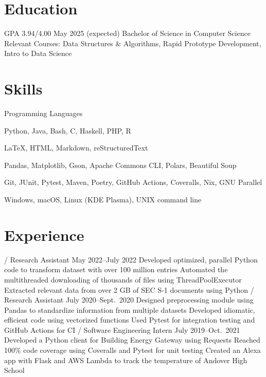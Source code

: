 \section{Education}
\begin{doutline}
     GPA 3.94/4.00
    \hfill May 2025 (expected)
        \2 Bachelor of Science in Computer Science
        \2 Relevant Courses: Data Structures \& Algorithms, Rapid Prototype Development, Intro to Data Science
\end{doutline}

\section{Skills}
\begin{labeling}{Programming Languages}
    \item [Programming Languages] Python, Java, Bash, C, Haskell, PHP, R
    \item [Markup Languages] \LaTeX, HTML, Markdown, reStructuredText
    \item [Libraries] Pandas, Matplotlib, Gson, Apache Commons CLI, Polars, Beautiful Soup
    \item [Tools] Git, JUnit, Pytest, Maven, Poetry, GitHub Actions, Coveralls, Nix, GNU Parallel
    \item [Operating Systems] Windows, macOS, Linux (KDE Plasma), UNIX command line
\end{labeling}

\section{Experience}
\begin{doutline}
     / Research Assistant
    \hfill May 2022--July 2022
        \2 Developed optimized, parallel Python code to transform dataset with over 100 million entries
        \2 Automated the multithreaded downloading of thousands of files using ThreadPoolExecutor
        \2 Extracted relevant data from over 2 GB of SEC S-1 documents using Python
     / Research Assistant
    \hfill July 2020--Sept.\ 2020
        \2 Designed preprocessing module using Pandas to standardize information from multiple datasets
            \3 Developed idiomatic, efficient code using vectorized functions
            \3 Used Pytest for integration testing and GitHub Actions for CI
     / Software Engineering Intern
    \hfill July 2019--Oct.\ 2021
        \2 Developed a Python client for Building Energy Gateway using Requests
            \3 Reached 100\% code coverage using Coveralls and Pytest for unit testing
        \2 Created an Alexa app with Flask and AWS Lambda to track the temperature of Andover High School
\end{doutline}

